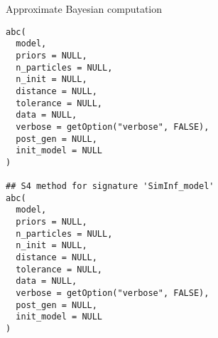 \documentclass[letterpaper]{book}
\begin{document}
%
\begin{Description}
Approximate Bayesian computation
\end{Description}
%
\begin{Usage}
\begin{verbatim}
abc(
  model,
  priors = NULL,
  n_particles = NULL,
  n_init = NULL,
  distance = NULL,
  tolerance = NULL,
  data = NULL,
  verbose = getOption("verbose", FALSE),
  post_gen = NULL,
  init_model = NULL
)

## S4 method for signature 'SimInf_model'
abc(
  model,
  priors = NULL,
  n_particles = NULL,
  n_init = NULL,
  distance = NULL,
  tolerance = NULL,
  data = NULL,
  verbose = getOption("verbose", FALSE),
  post_gen = NULL,
  init_model = NULL
)
\end{verbatim}
\end{Usage}
%
\end{document}

